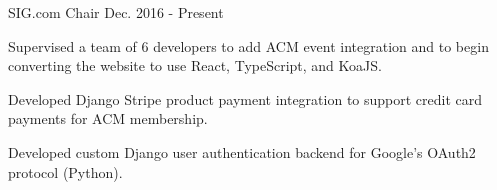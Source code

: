 \begin{cventries}
\cventry
  {SIG.com Chair} %
  {} %
  {} %
  {Dec. 2016 - Present} %
  {
    \begin{cvitems} %
      \item {Supervised a team of 6 developers to add ACM event integration and
        to begin converting the website to use React, TypeScript, and KoaJS.}
      \item {Developed Django Stripe product payment integration to support
        credit card payments for ACM membership.}
      \item {Developed custom Django user authentication backend for Google's
        OAuth2 protocol (Python).}
    \end{cvitems}
  }




\end{cventries}
